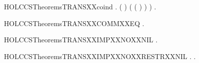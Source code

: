 \begin{SaveVerbatim}{HOLCCSTheoremsTRANSXXcoind}
            \HOLSymConst{\HOLTokenExists{}} .
                ( \HOLSymConst{=}   ) \HOLSymConst{\HOLTokenConj{}}
                 (  (  ) )  ) \HOLSymConst{\HOLTokenImp{}}
       \HOLSymConst{\HOLTokenForall{}}  .     \HOLSymConst{\HOLTokenImp{}}  \HOLTokenTransBegin{}\HOLTokenTransEnd {}
\end{SaveVerbatim}
\newcommand{\HOLCCSTheoremsTRANSXXcoind}{\UseVerbatim{HOLCCSTheoremsTRANSXXcoind}}
\begin{SaveVerbatim}{HOLCCSTheoremsTRANSXXCOMMXXEQ}
\HOLTokenTurnstile{} \HOLSymConst{\HOLTokenForall{}}   .  \HOLSymConst{\ensuremath{+}}  \HOLTokenTransBegin{}\HOLTokenTransEnd {} \HOLSymConst{\HOLTokenEquiv{}}  \HOLSymConst{\ensuremath{+}}  \HOLTokenTransBegin{}\HOLTokenTransEnd {}
\end{SaveVerbatim}
\newcommand{\HOLCCSTheoremsTRANSXXCOMMXXEQ}{\UseVerbatim{HOLCCSTheoremsTRANSXXCOMMXXEQ}}
\begin{SaveVerbatim}{HOLCCSTheoremsTRANSXXIMPXXNOXXNIL}
\HOLTokenTurnstile{} \HOLSymConst{\HOLTokenForall{}}  .  \HOLTokenTransBegin{}\HOLTokenTransEnd {} \HOLSymConst{\HOLTokenImp{}}  \HOLSymConst{\HOLTokenNotEqual{}} 
\end{SaveVerbatim}
\newcommand{\HOLCCSTheoremsTRANSXXIMPXXNOXXNIL}{\UseVerbatim{HOLCCSTheoremsTRANSXXIMPXXNOXXNIL}}
\begin{SaveVerbatim}{HOLCCSTheoremsTRANSXXIMPXXNOXXRESTRXXNIL}
\HOLTokenTurnstile{} \HOLSymConst{\HOLTokenForall{}}  .  \HOLTokenTransBegin{}\HOLTokenTransEnd {} \HOLSymConst{\HOLTokenImp{}} \HOLSymConst{\HOLTokenForall{}}.  \HOLSymConst{\HOLTokenNotEqual{}} \HOLConst{\ensuremath{\nu}}  
\end{SaveVerbatim}
